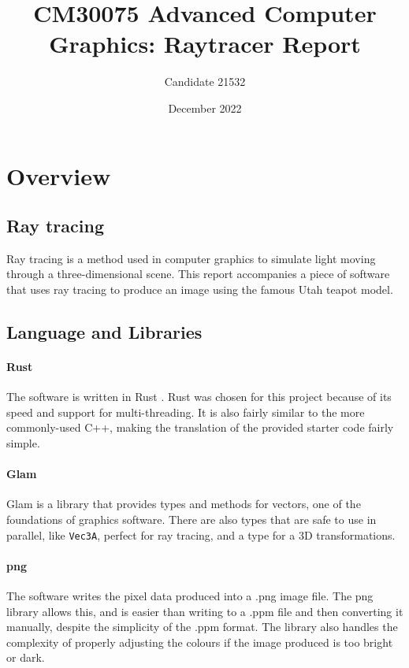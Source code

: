 \documentclass[a4paper]{article}
\title{CM30075 Advanced Computer Graphics: Raytracer Report}
\author{Candidate 21532}
\date{December 2022}
\begin{document}
\maketitle
\tableofcontents


\section{Overview}
\subsection{Ray tracing}
Ray tracing is a method used in computer graphics to simulate light moving through a three-dimensional scene. This report accompanies a piece of software that uses ray tracing to produce an image using the famous Utah teapot model.

\subsection{Language and Libraries}
\paragraph{Rust} The software is written in Rust \cite{}. Rust was chosen for this project because of its speed and support for multi-threading. It is also fairly similar to the more commonly-used C++, making the translation of the provided starter code fairly simple.

\paragraph{Glam} Glam is a library that provides types and methods for vectors, one of the foundations of graphics software. There are also types that are safe to use in parallel, like \texttt{Vec3A}, perfect for ray tracing, and a type for a 3D transformations.

\paragraph{png} The software writes the pixel data produced into a .png image file. The png library allows this, and is easier than writing to a .ppm file and then converting it manually, despite the simplicity of the .ppm format. The library also handles the complexity of properly adjusting the colours if the image produced is too bright or dark.
\end{document}
